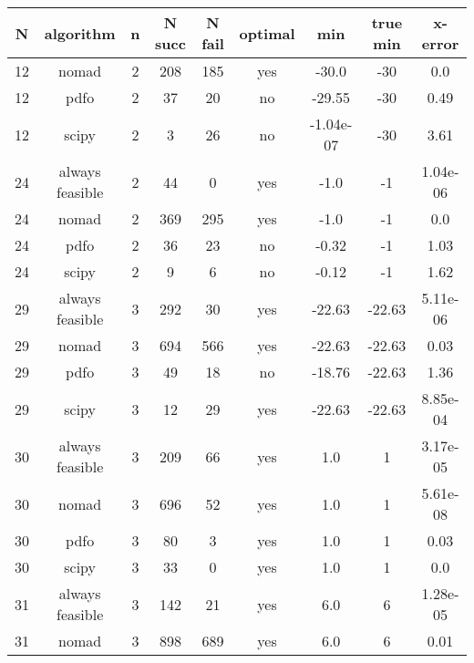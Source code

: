 
\begin{footnotesize}
\begin{center}
\begin{longtable}{ccccccccc}
  N &       algorithm &  n & N succ & N fail & optimal &         min &    true min &  x-error\\
\hline
\endhead
 12 &           nomad &  2 &    208 &    185 &     yes &       -30.0 &         -30 &      0.0\\
 12 &            pdfo &  2 &     37 &     20 &      no &      -29.55 &         -30 &     0.49\\
 12 &           scipy &  2 &      3 &     26 &      no &   -1.04e-07 &         -30 &     3.61\\
 24 & always feasible &  2 &     44 &      0 &     yes &        -1.0 &          -1 & 1.04e-06\\
 24 &           nomad &  2 &    369 &    295 &     yes &        -1.0 &          -1 &      0.0\\
 24 &            pdfo &  2 &     36 &     23 &      no &       -0.32 &          -1 &     1.03\\
 24 &           scipy &  2 &      9 &      6 &      no &       -0.12 &          -1 &     1.62\\
 29 & always feasible &  3 &    292 &     30 &     yes &      -22.63 &      -22.63 & 5.11e-06\\
 29 &           nomad &  3 &    694 &    566 &     yes &      -22.63 &      -22.63 &     0.03\\
 29 &            pdfo &  3 &     49 &     18 &      no &      -18.76 &      -22.63 &     1.36\\
 29 &           scipy &  3 &     12 &     29 &     yes &      -22.63 &      -22.63 & 8.85e-04\\
 30 & always feasible &  3 &    209 &     66 &     yes &         1.0 &           1 & 3.17e-05\\
 30 &           nomad &  3 &    696 &     52 &     yes &         1.0 &           1 & 5.61e-08\\
 30 &            pdfo &  3 &     80 &      3 &     yes &         1.0 &           1 &     0.03\\
 30 &           scipy &  3 &     33 &      0 &     yes &         1.0 &           1 &      0.0\\
 31 & always feasible &  3 &    142 &     21 &     yes &         6.0 &           6 & 1.28e-05\\
 31 &           nomad &  3 &    898 &    689 &     yes &         6.0 &           6 &     0.01\\

\end{longtable}
\end{center}
\end{footnotesize}

